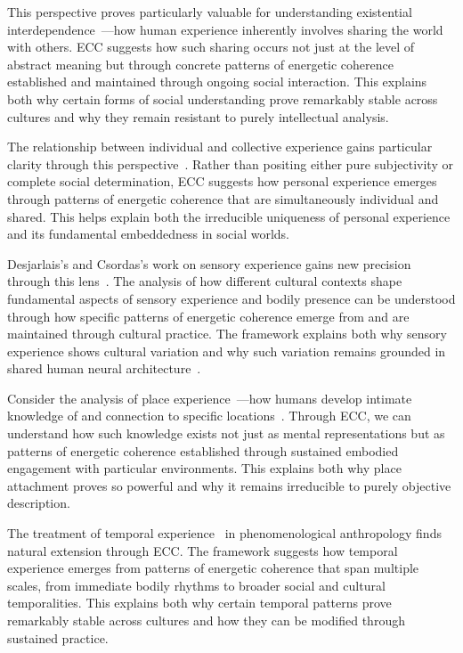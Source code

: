 This perspective proves particularly valuable for understanding existential interdependence~\cite{jackson1996things,ingold2011being}—how human experience inherently involves sharing the world with others. ECC suggests how such sharing occurs not just at the level of abstract meaning but through concrete patterns of energetic coherence established and maintained through ongoing social interaction. This explains both why certain forms of social understanding prove remarkably stable across cultures and why they remain resistant to purely intellectual analysis.

The relationship between individual and collective experience gains particular clarity through this perspective~\cite{strathern2004partial,toren1999mind}. Rather than positing either pure subjectivity or complete social determination, ECC suggests how personal experience emerges through patterns of energetic coherence that are simultaneously individual and shared. This helps explain both the irreducible uniqueness of personal experience and its fundamental embeddedness in social worlds.

Desjarlais's and Csordas's work on sensory experience gains new precision through this lens~\cite{desjarlais1992body,csordas1990embodiment}. The analysis of how different cultural contexts shape fundamental aspects of sensory experience and bodily presence can be understood through how specific patterns of energetic coherence emerge from and are maintained through cultural practice. The framework explains both why sensory experience shows cultural variation and why such variation remains grounded in shared human neural architecture~.

Consider the analysis of place experience~—how humans develop intimate knowledge of and connection to specific locations~\cite{casey1996space,ingold2011being}. Through ECC, we can understand how such knowledge exists not just as mental representations but as patterns of energetic coherence established through sustained embodied engagement with particular environments. This explains both why place attachment proves so powerful and why it remains irreducible to purely objective description.

The treatment of temporal experience~ in phenomenological anthropology finds natural extension through ECC. The framework suggests how temporal experience emerges from patterns of energetic coherence that span multiple scales, from immediate bodily rhythms to broader social and cultural temporalities. This explains both why certain temporal patterns prove remarkably stable across cultures and how they can be modified through sustained practice.

